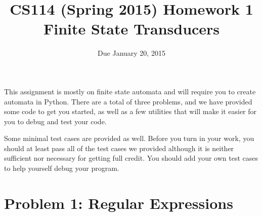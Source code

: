 \documentclass[11pt,letterpaper]{article}
\begin{document}
\title{CS114 (Spring 2015) Homework 1\\Finite State Transducers}
\author{Due January 20, 2015}
\date{}
\maketitle

{}

This assignment is mostly on finite state automata and will require you to
create automata in Python.
There are a total of three problems, and we
have provided some code to get you started, as well as a few utilities
that will make it easier for you to debug and test your code.  

Some minimal test cases are provided as well. 
Before you turn in your work, you should at least pass all of the test cases we provided although it is neither sufficient nor necessary for getting full credit. 
You should add your own test cases to help yourself debug your program.

\section*{Problem 1: Regular Expressions }
\end{document}
